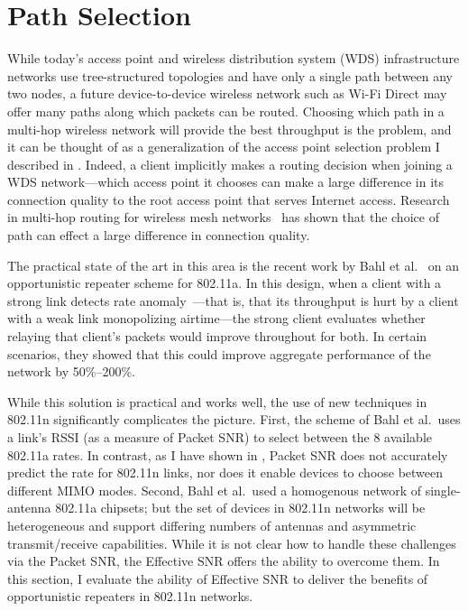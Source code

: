 \section{Path Selection}\label{sec:esnr_pathsel}
While today's access point and wireless distribution system (WDS) infrastructure networks use tree-structured topologies and have only a single path between any two nodes, a future device-to-device wireless network such as Wi-Fi Direct may offer many paths along which packets can be routed. Choosing which path in a multi-hop wireless network will provide the best throughput is the  problem, and it can be thought of as a generalization of the access point selection problem I described in . Indeed, a client implicitly makes a routing decision when joining a WDS network---which access point it chooses can make a large difference in its connection quality to the root access point that serves Internet access. Research in multi-hop routing for wireless mesh networks~\cite{Bahl_repeater,Rodrig_thesis} has shown that the choice of path can effect a large difference in connection quality.

The practical state of the art in this area is the recent work by Bahl et al.~\cite{Bahl_repeater} on an opportunistic repeater scheme for 802.11a. In this design, when a client with a strong link detects rate anomaly~\cite{Heusse_RateAnomaly}---that is, that its throughput is hurt by a client with a weak link monopolizing airtime---the strong client evaluates whether relaying that client's packets would improve throughout for both. In certain scenarios, they showed that this could improve aggregate performance of the network by 50\%--200\%.

While this solution is practical and works well, the use of new techniques in 802.11n significantly complicates the picture. First, the scheme of Bahl et al.\ uses a link's RSSI (as a measure of Packet SNR) to select between the 8 available 802.11a rates. In contrast, as I have shown in , Packet SNR does not accurately predict the rate for 802.11n links, nor does it enable devices to choose between different MIMO modes. Second, Bahl et al.\ used a homogenous network of single-antenna 802.11a chipsets; but the set of devices in 802.11n networks will be heterogeneous and support differing numbers of antennas and asymmetric transmit/receive capabilities. While it is not clear how to handle these challenges via the Packet SNR, the Effective SNR offers the ability to overcome them. In this section, I evaluate the ability of Effective SNR to deliver the benefits of opportunistic repeaters in 802.11n networks.

